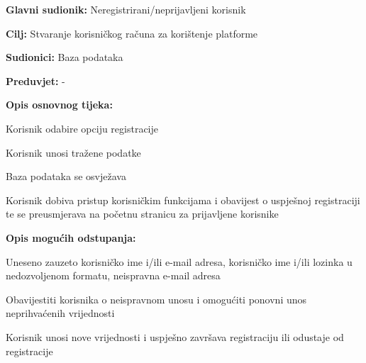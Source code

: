 					\noindent {}
					\begin{packed_item}
	
						\item \textbf{Glavni sudionik:} Neregistrirani/neprijavljeni korisnik
						\item  \textbf{Cilj:} Stvaranje korisničkog računa za korištenje platforme
						\item  \textbf{Sudionici:} Baza podataka
						\item  \textbf{Preduvjet:} -
						\item  \textbf{Opis osnovnog tijeka:}
						
						\item[] \begin{packed_enum}
	
							\item Korisnik odabire opciju registracije
							\item Korisnik unosi tražene podatke 
							\item Baza podataka se osvježava
							\item Korisnik dobiva pristup korisničkim funkcijama i obavijest o uspješnoj registraciji te se preusmjerava na početnu stranicu za prijavljene korisnike 
							
						\end{packed_enum}
						
						\item  \textbf{Opis mogućih odstupanja:}
						
						\item[] \begin{packed_item}
							
							\item[2.a] Uneseno zauzeto korisničko ime i/ili e-mail adresa, korisničko ime i/ili lozinka u nedozvoljenom formatu, neispravna e-mail adresa 
							\item[] \begin{packed_enum}
								
								\item Obavijestiti korisnika o neispravnom unosu i omogućiti ponovni unos neprihvaćenih vrijednosti
								\item Korisnik unosi nove vrijednosti i uspješno završava registraciju ili odustaje od registracije 
								
							\end{packed_enum}
						\end{packed_item}
					
					\end{packed_item}
					
